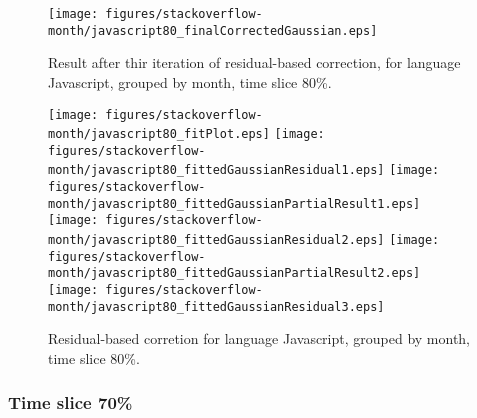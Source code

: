 \begin{figure}[]
\centering
{\texttt{[image: figures/stackoverflow-month/javascript80\_finalCorrectedGaussian.eps]}}
\caption{Result after thir iteration of residual-based correction, for language Javascript, grouped by month, time slice 80\%.}
\end{figure}


\begin{figure}[hb]
\centering
{}
{\texttt{[image: figures/stackoverflow-month/javascript80\_fitPlot.eps]}}
{\texttt{[image: figures/stackoverflow-month/javascript80\_fittedGaussianResidual1.eps]}}
{\texttt{[image: figures/stackoverflow-month/javascript80\_fittedGaussianPartialResult1.eps]}}
{\texttt{[image: figures/stackoverflow-month/javascript80\_fittedGaussianResidual2.eps]}}
{\texttt{[image: figures/stackoverflow-month/javascript80\_fittedGaussianPartialResult2.eps]}}
{\texttt{[image: figures/stackoverflow-month/javascript80\_fittedGaussianResidual3.eps]}}
\caption{Residual-based corretion for language Javascript, grouped by month, time slice 80\%.}
\end{figure}


\clearpage 
\newpage 


\FloatBarrier

\subsubsection{Time slice 70\%}

